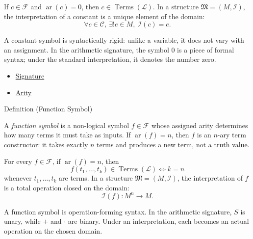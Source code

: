 \begin{remark*}
If $c\in\mathcal{F}$ and $\operatorname{ar}(c)=0$, then
$c\in\operatorname{Terms}(\mathcal{L})$. In a structure
$\mathfrak{M}=(M,\mathcal{I})$, the interpretation of a constant is a unique
element of the domain:
\[
  \forall c\in\mathcal{C},\ \exists! e\in M,\ \mathcal{I}(c)=e.
\]
\end{remark*}

\begin{remark*}[Interpretation]
A constant symbol is syntactically rigid: unlike a variable, it does not vary
with an assignment. In the arithmetic signature, the symbol $0$ is a piece of
formal syntax; under the standard interpretation, it denotes the number zero.
\end{remark*}

\begin{dependencies}
\begin{itemize}
  \item \hyperref[def:signature]{Signature}
  \item \hyperref[def:arity]{Arity}
\end{itemize}
\end{dependencies}

\begin{definitionbox}{Definition (Function Symbol)}
\begin{definition}
\label{def:signature-function-symbol}
A \emph{function symbol} is a non-logical symbol $f\in\mathcal{F}$ whose
assigned arity determines how many terms it must take as inputs. If
$\operatorname{ar}(f)=n$, then $f$ is an $n$-ary term constructor: it takes
exactly $n$ terms and produces a new term, not a truth value.
\end{definition}
\end{definitionbox}

\begin{remark*}
For every $f\in\mathcal{F}$, if $\operatorname{ar}(f)=n$, then
\[
  f(t_1,\ldots,t_k)\in\operatorname{Terms}(\mathcal{L})
  \iff k=n
\]
whenever $t_1,\ldots,t_k$ are terms. In a structure
$\mathfrak{M}=(M,\mathcal{I})$, the interpretation of $f$ is a total operation
closed on the domain:
\[
  \mathcal{I}(f):M^n\to M.
\]
\end{remark*}

\begin{remark*}[Interpretation]
A function symbol is operation-forming syntax. In the arithmetic signature,
$S$ is unary, while $+$ and $\cdot$ are binary. Under an interpretation, each
becomes an actual operation on the chosen domain.
\end{remark*}

